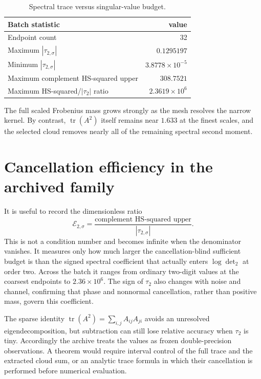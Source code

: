 \documentclass[11pt]{article}
\theoremstyle{remark}
\begin{document}
\begin{table}[ht]
\centering
\small
\begin{tabular}{lr}
\toprule
Batch statistic & value\\
\midrule
Endpoint count & 32\\
Maximum $|\tau_{2,\sigma}|$ & $0.1295197$\\
Minimum $|\tau_{2,\sigma}|$ & $3.8778\times10^{-5}$\\
Maximum complement HS-squared upper & $308.7521$\\
Maximum HS-squared/$|\tau_2|$ ratio & $2.3619\times10^6$\\
\bottomrule
\end{tabular}
\caption{Spectral trace versus singular-value budget.}
\end{table}

The full scaled Frobenius mass grows strongly as the mesh resolves the narrow
kernel.  By contrast, $\operatorname{tr}(A^2)$ itself remains near $1.633$ at
the finest scales, and the selected cloud removes nearly all of the remaining
spectral second moment.

\section{Cancellation efficiency in the archived family}

It is useful to record the dimensionless ratio
\[
 \mathcal E_{2,\sigma}
 =\frac{\text{complement HS-squared upper}}
        {|\tau_{2,\sigma}|}.
\]
This is not a condition number and becomes infinite when the denominator
vanishes.  It measures only how much larger the cancellation-blind sufficient
budget is than the signed spectral coefficient that actually enters
$\log\det_2$ at order two.  Across the batch it ranges from ordinary
two-digit values at the coarsest endpoints to $2.36\times10^6$.  The sign of
$\tau_2$ also changes with noise and channel, confirming that phase and
nonnormal cancellation, rather than positive mass, govern this coefficient.

The sparse identity
$\operatorname{tr}(A^2)=\sum_{i,j}A_{ij}A_{ji}$ avoids an unresolved
eigendecomposition, but subtraction can still lose relative accuracy when
$\tau_2$ is tiny.  Accordingly the archive treats the values as frozen
double-precision observations.  A theorem would require interval control of
the full trace and the extracted cloud sum, or an analytic trace formula in
which their cancellation is performed before numerical evaluation.
\end{document}
